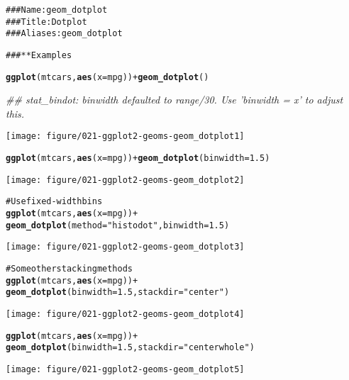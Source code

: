 \documentclass[a4paper,titlepage]{tufte-handout}\usepackage{graphicx, color}
\makeatletter
\def\maxwidth{ %
  \ifdim\Gin@nat@width>\linewidth
    \linewidth
  \else
    \Gin@nat@width
  \fi
}
\newcommand{\hlfunctioncall}[1]{\textcolor[rgb]{0.501960784313725,0,0.329411764705882}{\textbf{#1}}}%
\newcommand{\hlstring}[1]{\textcolor[rgb]{0.6,0.6,1}{#1}}%
\newcommand{\hlcomment}[1]{\textcolor[rgb]{0.180392156862745,0.6,0.341176470588235}{#1}}%
\newenvironment{kframe}{%
 \def\at@end@of@kframe{}%
 \ifinner\ifhmode%
  \def\at@end@of@kframe{\end{minipage}}%
  \begin{minipage}{\columnwidth}%
 \fi\fi%
 \def\FrameCommand##1{\hskip\@totalleftmargin \hskip-\fboxsep
 \colorbox{shadecolor}{##1}\hskip-\fboxsep
     \hskip-\linewidth \hskip-\@totalleftmargin \hskip\columnwidth}%
 \MakeFramed {\advance\hsize-\width
   \@totalleftmargin\z@ \linewidth\hsize
   \@setminipage}}%
 {\par\unskip\endMakeFramed%
 \at@end@of@kframe}
\newenvironment{knitrout}{}{} %
\makeatother
\begin{document}
\begin{knitrout}
\color{fgcolor}\begin{kframe}
\begin{alltt}
\hlcomment{### Name: geom_dotplot}
\hlcomment{### Title: Dot plot}
\hlcomment{### Aliases: geom_dotplot}

\hlcomment{### ** Examples}

\hlfunctioncall{ggplot}(mtcars, \hlfunctioncall{aes}(x = mpg)) + \hlfunctioncall{geom_dotplot}()
\end{alltt}


{\ttfamily\noindent\itshape\textcolor{messagecolor}{\#\# stat\_bindot: binwidth defaulted to range/30. Use 'binwidth = x' to adjust this.}}\end{kframe}
\texttt{[image: figure/021-ggplot2-geoms-geom\_dotplot1]} 
\begin{kframe}\begin{alltt}
\hlfunctioncall{ggplot}(mtcars, \hlfunctioncall{aes}(x = mpg)) + \hlfunctioncall{geom_dotplot}(binwidth = 1.5)
\end{alltt}
\end{kframe}
\texttt{[image: figure/021-ggplot2-geoms-geom\_dotplot2]} 
\begin{kframe}\begin{alltt}

\hlcomment{# Use fixed-width bins}
\hlfunctioncall{ggplot}(mtcars, \hlfunctioncall{aes}(x = mpg)) +
  \hlfunctioncall{geom_dotplot}(method=\hlstring{"histodot"}, binwidth = 1.5)
\end{alltt}
\end{kframe}
\texttt{[image: figure/021-ggplot2-geoms-geom\_dotplot3]} 
\begin{kframe}\begin{alltt}

\hlcomment{# Some other stacking methods}
\hlfunctioncall{ggplot}(mtcars, \hlfunctioncall{aes}(x = mpg)) +
  \hlfunctioncall{geom_dotplot}(binwidth = 1.5, stackdir = \hlstring{"center"})
\end{alltt}
\end{kframe}
\texttt{[image: figure/021-ggplot2-geoms-geom\_dotplot4]} 
\begin{kframe}\begin{alltt}
\hlfunctioncall{ggplot}(mtcars, \hlfunctioncall{aes}(x = mpg)) +
  \hlfunctioncall{geom_dotplot}(binwidth = 1.5, stackdir = \hlstring{"centerwhole"})
\end{alltt}
\end{kframe}
\texttt{[image: figure/021-ggplot2-geoms-geom\_dotplot5]} 
\begin{kframe}\begin{alltt}


\end{alltt}
\end{kframe}
\end{knitrout}
\end{document}
